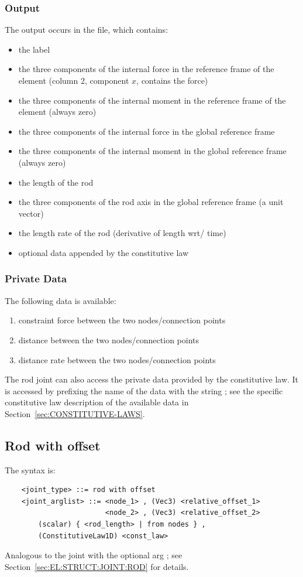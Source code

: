 \subsubsection{Output}
The output occurs in the  file, which contains:
\begin{itemize}
\item the label
\item the three components of the internal force in the reference frame
of the element (column 2, component $x$, contains the force)
\item the three components of the internal moment in the reference frame
of the element (always zero)
\item the three components of the internal force in the global
reference frame
\item the three components of the internal moment in the global
reference frame (always zero)
\item the length of the rod
\item the three components of the rod axis in the global reference frame
(a unit vector)
\item the length rate of the rod (derivative of length wrt/ time)
\item optional data appended by the constitutive law
\end{itemize}

\subsubsection{Private Data}
The following data is available:
\begin{enumerate}
\item {} constraint force between the two nodes/connection points
\item {} distance between the two nodes/connection points
\item {} distance rate between the two nodes/connection points
\end{enumerate}
The rod joint can also access the private data provided 
by the constitutive law.
It is accessed by prefixing the name of the data with the string
; see the specific constitutive law
description of the available data in Section~\ref{sec:CONSTITUTIVE-LAWS}.





\subsection{Rod with offset}
\label{sec:EL:STRUCT:JOINT:ROD_WITH_OFFSET}
The syntax is:
\begin{verbatim}
    <joint_type> ::= rod with offset
    <joint_arglist> ::= <node_1> , (Vec3) <relative_offset_1>
                        <node_2> , (Vec3) <relative_offset_2>
        (scalar) { <rod_length> | from nodes } ,
        (ConstitutiveLaw1D) <const_law>
\end{verbatim}
Analogous to the  joint with the optional arg ;
see Section~\ref{sec:EL:STRUCT:JOINT:ROD} for details.



